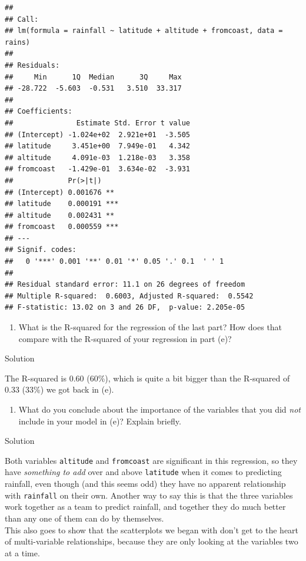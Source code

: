 \documentclass[]{tufte-book}
\providecommand{\tightlist}{%
  \setlength{\itemsep}{0pt}\setlength{\parskip}{0pt}}
\theoremstyle{definition}
\theoremstyle{definition}
\theoremstyle{definition}
\theoremstyle{remark}
\begin{document}
\begin{verbatim}
## 
## Call:
## lm(formula = rainfall ~ latitude + altitude + fromcoast, data = rains)
## 
## Residuals:
##     Min      1Q  Median      3Q     Max 
## -28.722  -5.603  -0.531   3.510  33.317 
## 
## Coefficients:
##               Estimate Std. Error t value
## (Intercept) -1.024e+02  2.921e+01  -3.505
## latitude     3.451e+00  7.949e-01   4.342
## altitude     4.091e-03  1.218e-03   3.358
## fromcoast   -1.429e-01  3.634e-02  -3.931
##             Pr(>|t|)    
## (Intercept) 0.001676 ** 
## latitude    0.000191 ***
## altitude    0.002431 ** 
## fromcoast   0.000559 ***
## ---
## Signif. codes:  
##   0 '***' 0.001 '**' 0.01 '*' 0.05 '.' 0.1  ' ' 1
## 
## Residual standard error: 11.1 on 26 degrees of freedom
## Multiple R-squared:  0.6003, Adjusted R-squared:  0.5542 
## F-statistic: 13.02 on 3 and 26 DF,  p-value: 2.205e-05
\end{verbatim}

\begin{enumerate}
\def\labelenumi{(\alph{enumi})}
\setcounter{enumi}{6}
\tightlist
\item
  What is the R-squared for the regression of the last part? How does
  that compare with the R-squared of your regression in part (e)?
\end{enumerate}

Solution

The R-squared is 0.60 (60\%), which is quite a bit bigger than the
R-squared of 0.33 (33\%) we got back in (e).

\begin{enumerate}
\def\labelenumi{(\alph{enumi})}
\setcounter{enumi}{7}
\tightlist
\item
  What do you conclude about the importance of the variables that you
  did \emph{not} include in your model in (e)? Explain briefly.
\end{enumerate}

Solution

Both variables \texttt{altitude} and \texttt{fromcoast} are significant
in this regression, so they have \emph{something to add} over and above
\texttt{latitude} when it comes to predicting rainfall, even though (and
this seems odd) they have no apparent relationship with
\texttt{rainfall} on their own. Another way to say this is that the
three variables work together as a team to predict rainfall, and
together they do much better than any one of them can do by
themselves.\\
This also goes to show that the scatterplots we began with don't get to
the heart of multi-variable relationships, because they are only looking
at the variables two at a time.
\end{document}
